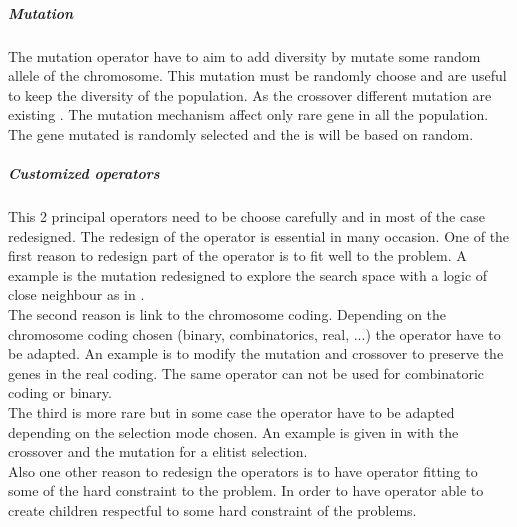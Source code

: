  \subparagraph{Mutation}
The mutation operator have to aim to add diversity by mutate some random allele of the chromosome. This mutation must be randomly choose and are useful to keep the diversity of the population. As the crossover different mutation are existing \cite{113*mais2010}. The mutation mechanism affect only rare gene in all the population. The gene mutated is randomly selected and the is will be based on random. 

\subparagraph*{Customized operators}
This 2 principal operators need to be choose carefully and in most of the case redesigned.
The redesign of the operator is essential in many occasion.
One of the first reason to redesign part of the operator is to fit well to the problem. A example is the mutation redesigned to explore the search space with a logic of close neighbour as in \cite{68*muhlenbein1989}.\\
The second reason is link to the chromosome coding. Depending on the chromosome coding chosen (binary, combinatorics, real, ...) the operator have to be adapted. An example is to modify the mutation and crossover to preserve the genes in the real coding. The same operator can not be used for combinatoric coding or binary.\\
The third is more rare but in some case the operator have to be adapted depending on the selection mode chosen. An example is  given in  \cite{65*thierens1994} with the crossover and the mutation for a elitist selection. \\
Also one other reason to redesign the operators is to have operator fitting  to some of the hard constraint to the problem. In order to have operator able to create children respectful to some hard constraint of the problems.




